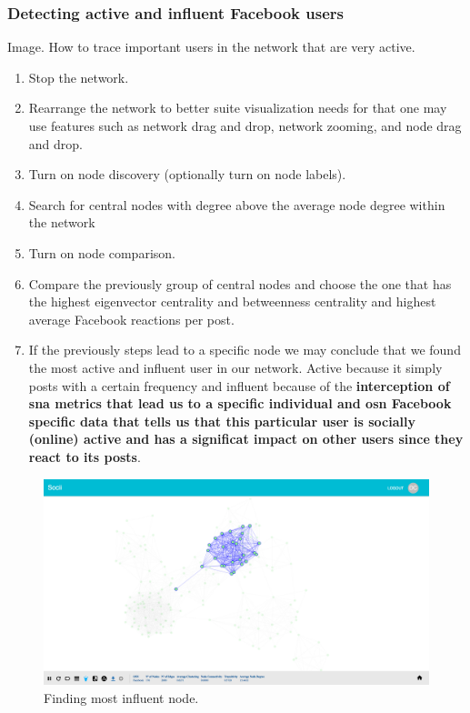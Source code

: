 \subsubsection{Detecting active and influent Facebook users}
Image. How to trace important users in the network that are very active.
\begin{enumerate}
    \item Stop the network.
    \item Rearrange the network to better suite visualization needs for that one may use features such as network drag and drop, network zooming, and node drag and drop.
    \item Turn on node discovery (optionally turn on node labels).
    \item Search for central nodes with degree above the average node degree within the network
    \item Turn on node comparison.
    \item Compare the previously group of central nodes and choose the one that has the highest eigenvector centrality
    and betweenness centrality and highest average Facebook reactions per post.
    \item If the previously steps lead to a specific node we may conclude that we found the most active and influent user in our network. Active because it simply posts with a certain frequency and influent because of the \textbf{interception of \gls{sna} metrics that lead us to a specific individual and \gls{osn} Facebook specific data that tells us that this particular user is socially (online) active and has a significat impact on other users since they react to its posts}.
\end{enumerate}

\begin{figure}[h!]
\begin{center}
  \hspace*{-0.8in}
  \includegraphics[width=1.2\textwidth]{img/socii/socii_12.png}
\end{center}
\caption{\label{img:socii_12} Finding most influent node.}
\end{figure}

